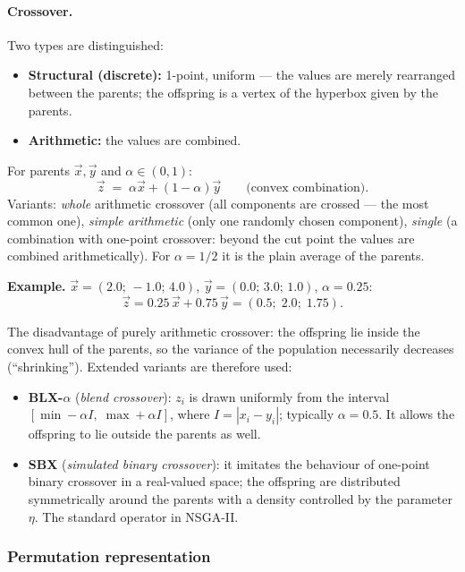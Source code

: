 \documentclass[11pt,a4paper]{article}
\theoremstyle{definition}
\providecommand{\uv}[1]{``#1''}
\begin{document}
\paragraph{Crossover.} Two types are distinguished:
\begin{itemize}
\item \textbf{Structural (discrete):} 1-point, uniform --- the values are merely
  rearranged between the parents; the offspring is a vertex of the hyperbox
  given by the parents.
\item \textbf{Arithmetic:} the values are combined.
\end{itemize}

\begin{defbox}
For parents $\vec x, \vec y$ and $\alpha \in (0,1)$:
\[
\vec z \;=\; \alpha \vec x + (1-\alpha)\vec y \qquad\text{(convex combination)}.
\]
Variants: \emph{whole} arithmetic crossover (all components are crossed --- the
most common one), \emph{simple arithmetic} (only one randomly chosen
component), \emph{single} (a combination with one-point crossover: beyond the
cut point the values are combined arithmetically). For $\alpha = 1/2$ it is the
plain average of the parents.
\end{defbox}

\textbf{Example.} $\vec x = (2.0;\, -1.0;\, 4.0)$,
$\vec y = (0.0;\, 3.0;\, 1.0)$, $\alpha = 0.25$:
\[
\vec z = 0.25\,\vec x + 0.75\,\vec y = (0.5;\; 2.0;\; 1.75).
\]

The disadvantage of purely arithmetic crossover: the offspring lie inside the
convex hull of the parents, so the variance of the population necessarily
decreases (\uv{shrinking}). Extended variants are therefore used:
\begin{itemize}
\item \textbf{BLX-$\alpha$} (\emph{blend crossover}): $z_i$ is drawn uniformly
  from the interval $[\min - \alpha I,\; \max + \alpha I]$, where
  $I = |x_i - y_i|$; typically $\alpha = 0.5$. It allows the offspring to lie
  outside the parents as well.
\item \textbf{SBX} (\emph{simulated binary crossover}): it imitates the
  behaviour of one-point binary crossover in a real-valued space; the offspring
  are distributed symmetrically around the parents with a density controlled by
  the parameter $\eta$. The standard operator in NSGA-II.
\end{itemize}

\subsubsection{Permutation representation}
\end{document}
